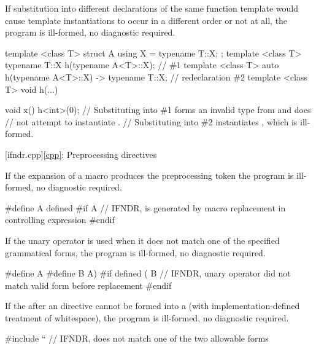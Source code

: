 
\pnum
If substitution
into different declarations
of the same function template
would cause template instantiations to occur
in a different order or not at all,
the program is ill-formed, no diagnostic required.

\pnum
\begin{example}
\begin{codeblock}
template <class T> struct A { using X = typename T::X; };
template <class T> typename T::X h(typename A<T>::X);           // \#1
template <class T> auto h(typename A<T>::X) -> typename T::X;   // redeclaration \#2
template <class T> void h(...) { }

void x() {
  h<int>(0);    // Substituting into \#1 forms an invalid type from  and does
                // not attempt to instantiate .
                // Substituting into \#2 instantiates , which is ill-formed.
}
\end{codeblock}
\end{example}

[ifndr.cpp]{\ref*{cpp}: Preprocessing directives}


\pnum
If the expansion of a macro produces the preprocessing token 
the program is ill-formed, no diagnostic required.

\pnum
\begin{example}
\begin{codeblock}
#define A defined
#if A   // IFNDR,  is generated by macro replacement in controlling expression
#endif
\end{codeblock}
\end{example}


\pnum
If the  unary operator is used when it
does not match
one of the specified grammatical forms,
the program is ill-formed, no diagnostic required.

\pnum
\begin{example}
\begin{codeblock}
#define A
#define B A)
#if defined ( B // IFNDR, unary operator  did not match valid form before replacement
#endif
\end{codeblock}
\end{example}


\pnum
If the  after
an  directive
cannot be formed into a 
(with imp\-lementation-defined treatment of whitespace),
the program is ill-formed, no diagnostic required.

\pnum
\begin{example}
\begin{codeblock}
#include ``     // IFNDR, does not match one of the two allowable forms
\end{codeblock}
\end{example}
